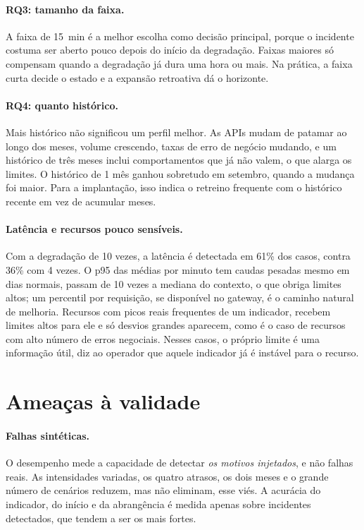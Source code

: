 \documentclass[sigconf,nonacm]{acmart}
\begin{document}
\paragraph{RQ3: tamanho da faixa.} A faixa de 15~min é a melhor escolha como decisão principal, porque o incidente costuma ser aberto pouco depois do início da degradação. Faixas maiores só compensam quando a degradação já dura uma hora ou mais. Na prática, a faixa curta decide o estado e a expansão retroativa dá o horizonte.

\paragraph{RQ4: quanto histórico.} Mais histórico não significou um perfil melhor. As APIs mudam de patamar ao longo dos meses, volume crescendo, taxas de erro de negócio mudando, e um histórico de três meses inclui comportamentos que já não valem, o que alarga os limites. O histórico de 1 mês ganhou sobretudo em setembro, quando a mudança foi maior. Para a implantação, isso indica o retreino frequente com o histórico recente em vez de acumular meses.

\paragraph{Latência e recursos pouco sensíveis.} Com a degradação de 10 vezes, a latência é detectada em 61\% dos casos, contra 36\% com 4 vezes. O p95 das médias por minuto tem caudas pesadas mesmo em dias normais, passam de 10 vezes a mediana do contexto, o que obriga limites altos; um percentil por requisição, se disponível no gateway, é o caminho natural de melhoria. Recursos com picos reais frequentes de um indicador, recebem limites altos para ele e só desvios grandes aparecem, como é o caso de recursos com alto número de erros negociais. Nesses casos, o próprio limite é uma informação útil, diz ao operador que aquele indicador já é instável para o recurso.

\section{Ameaças à validade}\label{sec:ameacas}

\paragraph{Falhas sintéticas.} O desempenho mede a capacidade de detectar \emph{os motivos injetados}, e não falhas reais. As intensidades variadas, os quatro atrasos, os dois meses e o grande número de cenários reduzem, mas não eliminam, esse viés. A acurácia do indicador, do início e da abrangência é medida apenas sobre incidentes detectados, que tendem a ser os mais fortes.
\end{document}
